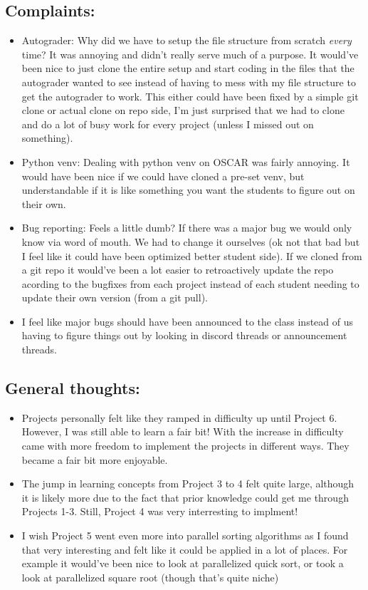 \documentclass[11pt]{article}
\begin{document}
\subsection{Complaints:}
\begin{itemize}
    \item Autograder: Why did we have to setup the file structure from scratch \textit{every} time? It was annoying and didn't really serve much of a purpose. It would've been nice to just clone the entire setup and start coding in the files that the autograder wanted to see instead of having to mess with my file structure to get the autograder to work. This either could have been fixed by a simple git clone or actual clone on repo side, I'm just surprised that we had to clone and do a lot of busy work for every project (unless I missed out on something).
    \item Python venv: Dealing with python venv on OSCAR was fairly annoying. It would have been nice if we could have cloned a pre-set venv, but understandable if it is like something you want the students to figure out on their own. 
    \item Bug reporting: Feels a little dumb? If there was a major bug we would only know via word of mouth. We had to change it ourselves (ok not that bad but I feel like it could have been optimized better student side). If we cloned from a git repo it would've been a lot easier to retroactively update the repo acording to the bugfixes from each project instead of each student needing to update their own version (from a git pull). 
    \item I feel like major bugs should have been announced to the class instead of us having to figure things out by looking in discord threads or announcement threads.
\end{itemize}

\subsection{General thoughts: }
\begin{itemize}
    \item Projects personally felt like they ramped in difficulty up until Project 6. However, I was still able to learn a fair bit! With the increase in difficulty came with more freedom to implement the projects in different ways. They became a fair bit more enjoyable.  
    \item The jump in learning concepts from Project 3 to 4 felt quite large, although it is likely more due to the fact that prior knowledge could get me through Projects 1-3. Still, Project 4 was very interresting to implment!
    \item I wish Project 5 went even more into parallel sorting algorithms as I found that very interesting and felt like it could be applied in a lot of places. For example it would've been nice to look at parallelized quick sort, or took a look at parallelized square root (though that's quite niche)
\end{itemize}
\end{document}
